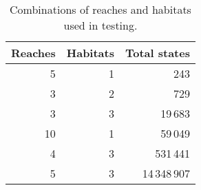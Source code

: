 \begin{table}[H]
\centering
\caption{Combinations of reaches and habitats used in testing.}
\label{tab:reaches_habitats}
\begin{tabular}{rrr}
 \toprule
 Reaches & Habitats & Total states \\
 \midrule
 5  & 1 &          243 \\
 3  & 2 &          729 \\
 3  & 3 &      19\,683 \\
 10 & 1 &      59\,049 \\
 4  & 3 &     531\,441 \\
 5  & 3 & 14\,348\,907 \\
 \bottomrule
\end{tabular}
\end{table}
